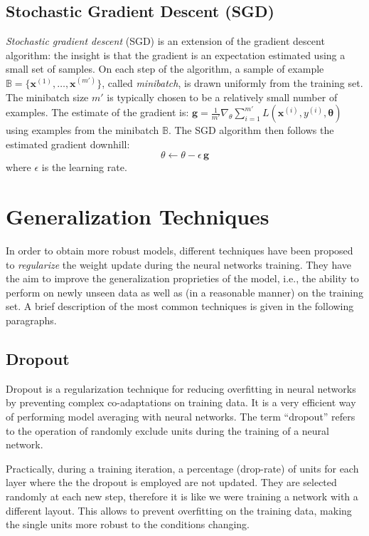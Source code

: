 \subsection{Stochastic Gradient Descent (SGD)}

\textit{Stochastic gradient descent} (SGD) is an extension of the gradient descent algorithm: the insight is that the gradient is an expectation estimated using a small set of samples.
On each step of the algorithm, a sample of example $\mathbb{B} = \{ \textbf{x}^{(1)}, \ldots, \textbf{x}^{(m')}\}$, called \textit{minibatch}, is drawn uniformly from the training set.
The minibatch size $m'$ is typically chosen to be a relatively small number of examples.
The estimate of the gradient is:
$\textbf{g} = \frac{1}{m'} \nabla_{\theta} \sum\limits_{i=1}^{m'} L(\textbf{x}^{(i)}, y^{(i)}, \mathbf{\theta})$
using examples from the minibatch $\mathbb{B}$.
The SGD algorithm then follows the estimated gradient downhill:
\begin{equation}
\theta \leftarrow \theta - \epsilon\,\textbf{g}
\end{equation}
where $\epsilon$ is the learning rate.


\section{Generalization Techniques}

In order to obtain more robust models, different techniques have been proposed to \textit{regularize} the weight update during the neural networks training. They have the aim to improve the generalization proprieties of the model, i.e., the ability to perform on newly unseen data as well as (in a reasonable manner) on the training set. A brief description of the most common techniques is given in the following paragraphs.

\subsection{Dropout}

Dropout \cite{srivastava2014dropout} is a regularization technique for reducing overfitting in neural networks by preventing complex co-adaptations on training data. It is a very efficient way of performing model averaging with neural networks. The term ``dropout'' refers to the operation of randomly exclude units during the training of a neural network.

Practically, during a training iteration, a percentage (drop-rate) of units for each layer where the the dropout is employed are not updated. They are selected randomly at each new step, therefore it is like we were training a network with a different layout. This allows to prevent overfitting on the training data, making  the single units more robust to the conditions changing.
 
